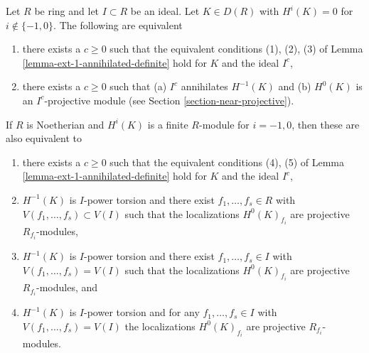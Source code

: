 \begin{lemma}
\label{lemma-ext-1-annihilated}
Let $R$ be ring and let $I \subset R$ be an ideal.
Let $K \in D(R)$ with $H^i(K) = 0$ for $i \not \in \{-1, 0\}$.
The following are equivalent
\begin{enumerate}
\item there exists a $c \geq 0$ such that the equivalent
conditions (1), (2), (3) of Lemma \ref{lemma-ext-1-annihilated-definite}
hold for $K$ and the ideal $I^c$,
\item there exists a $c \geq 0$ such that (a) $I^c$ annihilates
$H^{-1}(K)$ and (b) $H^0(K)$ is an $I^c$-projective module (see
Section \ref{section-near-projective}).
\end{enumerate}
If $R$ is Noetherian and $H^i(K)$ is a finite $R$-module
for $i = -1, 0$, then these are also equivalent to
\begin{enumerate}
\item[(3)] there exists a $c \geq 0$ such that the equivalent
conditions (4), (5) of Lemma \ref{lemma-ext-1-annihilated-definite}
hold for $K$ and the ideal $I^c$,
\item[(4)] $H^{-1}(K)$ is $I$-power torsion and there exist
$f_1, \ldots, f_s \in R$ with $V(f_1, \ldots, f_s) \subset V(I)$
such that the localizations $H^0(K)_{f_i}$ are projective
$R_{f_i}$-modules,
\item[(5)] $H^{-1}(K)$ is $I$-power torsion and there exist
$f_1, \ldots, f_s \in I$ with $V(f_1, \ldots, f_s) = V(I)$
such that the localizations $H^0(K)_{f_i}$ are projective
$R_{f_i}$-modules, and
\item[(6)] $H^{-1}(K)$ is $I$-power torsion and for any
$f_1, \ldots, f_s \in I$ with $V(f_1, \ldots, f_s) = V(I)$
the localizations $H^0(K)_{f_i}$ are projective $R_{f_i}$-modules.
\end{enumerate}
\end{lemma}

